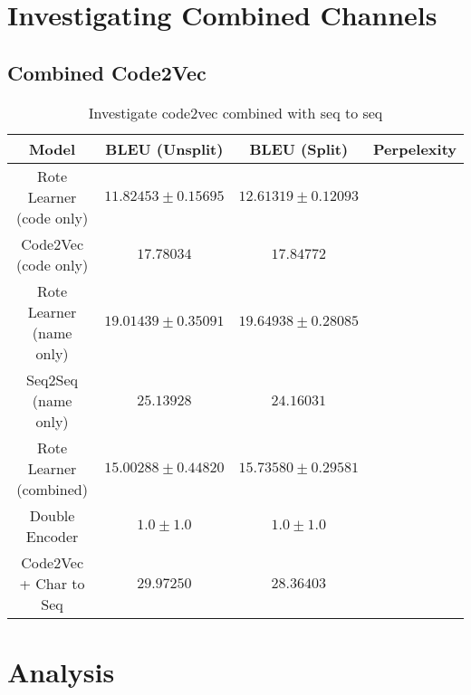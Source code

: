 \section{Investigating Combined Channels} %
\label{sec:investigating_combined_channels}

\subsection{Combined Code2Vec } %
\label{sub:combined_code2vec}


\begin{table}[h!]
\begin{center}
\begin{tabular}{ c | c | c | c }
    Model                             & BLEU (Unsplit)  & BLEU (Split)    & Perpelexity \\
    \hline
    Rote Learner  (code only)         & $ 11.82453 \pm  0.15695 $ & $ 12.61319 \pm 0.12093 $ & \\
    Code2Vec  (code only)             & $ 17.78034 $ & $ 17.84772 $ & \\
    \hline
    \hline
    Rote Learner  (name only)         & $ 19.01439 \pm  0.35091 $ & $ 19.64938 \pm 0.28085 $ & \\
    Seq2Seq  (name only)              & $ 25.13928 $ & $ 24.16031 $ & \\
    \hline
    \hline
    Rote Learner (combined)            & $ 15.00288 \pm  0.44820 $ & $ 15.73580 \pm 0.29581 $ & \\
    Double Encoder                    & $1.0 \pm 1.0 $  & $1.0 \pm 1.0 $  &  \\
    Code2Vec  + Char to Seq           & $ 29.97250 $ & $ 28.36403 $ & \\
    \hline
\end{tabular}
\caption {Investigate code2vec combined with seq to seq}
\label{table:code2vec_embed}
\end{center}
\end{table}





\section{Analysis} %
\label{sec:analysis}


